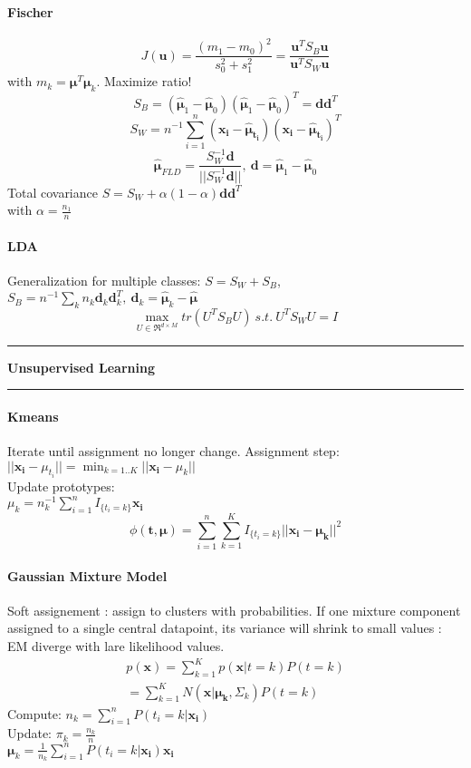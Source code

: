 \documentclass[7pt]{scrartcl}
\newlength{\secskip}
\renewcommand{\section}[1]{
  \hrule\vspace{.1em}
  \textbf{#1}
  \hrule
}
\renewcommand{\vec}{\mathbf}
\begin{document}
\begin{multicols}{4}
\paragraph{Fischer}
\[J(\vec{u}) = \frac{(m_1 - m_0)^2}{s_0^2 + s_1^2} = \frac{\vec{u}^T S_B \vec{u}}{\vec{u}^T S_W \vec{u}}\]
with $m_k = \vec{\mu}^T \vec{\mu}_k$. Maximize ratio!
\[S_B = (\hat{\vec{\mu}}_1 -\hat{\vec{\mu}}_0)(\hat{\vec{\mu}}_1 -\hat{\vec{\mu}}_0)^T = \vec d \vec d^T\]
\[S_W = n^{-1} \sum_{i=1}^n(\vec{x_i} - \vec{\hat{\mu}_{t_i}})(\vec{x_i} - \vec{\hat{\mu}_{t_i}})^T\]
\[\vec{\hat{\mu}}_{FLD} = \frac{S_W^{-1} \vec{d}}{||S_W^{-1} \vec{d}||}, ~ \vec{d} = \hat{\vec{\mu}}_1 -\hat{\vec{\mu}}_0\]
Total covariance $S=S_W + \alpha(1-\alpha)\vec d \vec d^T$\\with $ \alpha = \frac{n_1}{n}$
\paragraph{LDA}
Generalization for multiple classes: $S=S_W+S_B$, $S_B = n^{-1}\sum_k n_k \vec d_k\vec d_k^T, ~ \vec d_k = \vec {\hat{\mu}}_k - \vec{ \hat{\mu}}$
\[\max_{U \in \Re^{d \times M}} tr(U^T S_B U) ~s.t.~ U^T S_WU = I\]

\section{Unsupervised Learning}
\paragraph{Kmeans}
Iterate until assignment no longer change. Assignment step: \\
$||\vec{x_i} - \mu_{t_i}|| = \min_{k=1..K} || \vec{x_i} - \mu_{k}||$\\
Update prototypes:\\$\mu_k = n_k^{-1} \sum_{i=1}^n I_{\{t_i=k\}}\vec{x_i}$
\[\phi(\vec{t,\mu}) = \sum_{i=1}^n\sum_{k=1}^K I_{\{t_i=k\}} || \vec{x_i} - \vec{\mu_k} || ^2\]
\paragraph{Gaussian Mixture Model} Soft assignement : assign to clusters with probabilities. If one mixture component assigned to a single central datapoint, its variance will shrink to small values : EM diverge with lare likelihood values.
\begin{align*}
p(\vec{x}) = \sum_{k=1}^K p(\vec{x}|t=k) P(t=k) \\
=  \sum_{k=1}^K N(\vec{x}|\vec{\mu_k},\Sigma_k)P(t=k)
\end{align*}
Compute: $n_k = \sum_{i=1}^nP(t_i=k|\vec{x_i})$\\Update: $\pi_k = \frac{n_k}{n}$\\
$\vec{\mu}_k = \frac{1}{n_k}\sum_{i=1}^nP(t_i=k|\vec{x_i})\vec{x_i}$


\end{multicols}
\end{document}
